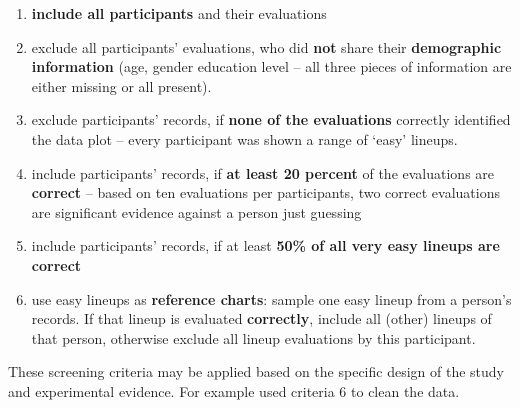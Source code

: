 \documentclass[11pt]{article}
\begin{document}
\begin{enumerate}
\item {\bf include all participants} and their evaluations
\item exclude all participants' evaluations, who did {\bf not} share their {\bf demographic information} (age, gender education level -- all three pieces of information are either missing or all present).
\item exclude participants' records, if {\bf none of the evaluations}  correctly identified the data plot -- every participant was shown a range of `easy' lineups.
\item include participants' records, if   {\bf at least 20 percent} of the evaluations are {\bf correct}  -- based on ten evaluations per participants, two correct evaluations are significant evidence against a person just guessing
\item include participants' records, if at least {\bf 50\% of all very easy lineups are correct} 
\item use easy lineups as {\bf reference charts}: sample one easy lineup from a person's records. If that lineup is evaluated {\bf correctly}, include all (other) lineups of that person, otherwise exclude all lineup evaluations by this participant.
\end{enumerate}

These screening criteria may be applied based on the specific design of the study and experimental evidence. For example \cite{majumder:2013} used criteria 6 to clean the data.





\end{document}
